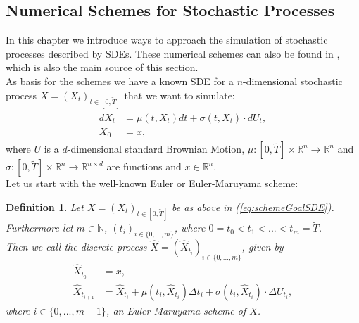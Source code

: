 \documentclass[12pt]{article}
\newtheorem{definition}[theorem]{Definition}
\begin{document}
	\subsection{Numerical Schemes for Stochastic Processes}
	In this chapter we introduce ways to approach the simulation of stochastic processes described by SDEs. These numerical schemes can also be found in \cite{kloedenSchemes}, which is also the main source of this section.\\
	As basis for the schemes we have a known SDE for a $n$-dimensional stochastic process $X=(X_t)_{t\in [0,\tilde{T}]}$ that we want to simulate:
	\begin{align}
		\begin{aligned}\label{eq:schemeGoalSDE}
		dX_t &= \mu(t, X_t)dt + \sigma(t, X_t) \cdot dU_t,\\
		X_0 &= x,
		\end{aligned}
	\end{align}
	where $U$ is a $d$-dimensional standard Brownian Motion, $\mu: [0,\tilde{T}] \times \mathbb{R}^n \rightarrow \mathbb{R}^n$ and $\sigma: [0,\tilde{T}] \times \mathbb{R}^n \rightarrow \mathbb{R}^{n \times d}$ are functions and $x \in \mathbb{R}^n$.\\
	Let us start with the well-known Euler or Euler-Maruyama scheme:
	\begin{definition}\label{def:eulerscheme}
		Let $X=(X_t)_{t\in [0,\tilde{T}]}$ be as above in (\ref{eq:schemeGoalSDE}).\\
		Furthermore let $m \in \mathbb{N}$, $(t_i)_{i\in \{0, ..., m\}}$, where $0=t_0 < t_1 < ... < t_m=\tilde{T}$.\\
		Then we call the discrete process $\hat{X} = (\hat{X}_{t_i})_{i \in \{0, ..., m\}}$, given by
		\begin{align*}
			\hat{X}_{t_0} &= x,\\
			\hat{X}_{t_{i+1}} &= \hat{X}_{t_{i}} + \mu(t_i, \hat{X}_{t_{i}})\Delta t_i + \sigma(t_i, \hat{X}_{t_{i}}) \cdot \Delta U_{t_i},
		\end{align*}
		where $i \in \{0, ..., m-1\}$, an \emph{Euler-Maruyama scheme of $X$}.
	\end{definition}
	
\end{document}
